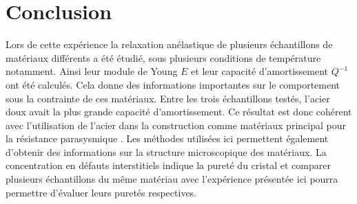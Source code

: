 \section{Conclusion}

Lors de cette expérience la relaxation anélastique de plusieurs échantillons de matériaux différents a été étudié, sous plusieurs conditions de température notamment. Ainsi leur module de Young \(E\) et leur capacité d'amortissement \(Q^{-1}\) ont été calculés. Cela donne des informations importantes sur le comportement sous la contrainte de ces matériaux. Entre les trois échantillons testés, l'acier doux avait la plus grande capacité d'amortissement. Ce résultat est donc cohérent avec l'utilisation de l'acier dans la construction comme matériaux principal pour la résistance parasysmique \cite{acier-construction}. Les méthodes utilisées ici permettent également d'obtenir des informations sur la structure microscopique des matériaux. La concentration en défauts interstitiels indique la pureté du cristal et comparer plusieurs échantillons du même matériau avec l'expérience présentée ici pourra permettre d'évaluer leurs puretés respectives.
